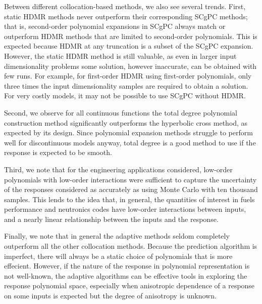 Between different collocation-based methods, we also see several trends.  First, static HDMR methods never outperform their
corresponding SCgPC methods; that is, second-order polynomial expansions in SCgPC always match or outperform HDMR methods
that are limited to second-order polynomials.  This is expected because HDMR at any truncation is a subset of the SCgPC
expansion.  However, the static HDMR method is still valuable, as even in larger input dimensionality problems
some solution, however inaccurate,
can be obtained with few runs.  For example, for first-order HDMR using first-order polynomials, only three times the input
dimensionality samples are required to obtain a solution.  For very costly models, it may not be possible to use SCgPC without
HDMR.

Second, we observe for all continuous functions the total degree polynomial construction method significantly outperforms
the hyperbolic cross method, as expected by its design.  Since polynomial expansion methods struggle to perform well for
discontinuous models anyway, total degree is a good method to use if the response is expected to be smooth.

Third, we note that for the engineering applications considered, low-order polynomials with low-order
interactions were sufficient to capture the uncertainty of the responses considered as accurately as using
Monte Carlo with ten thousand samples.  This lends to the idea that, in general, the quantities of interest in
fuels performance and neutronics codes have low-order interactions between inputs, and a nearly linear
relationship between the inputs and the response.

Finally, we note that in general the adaptive methods seldom completely outperform all the other collocation methods.  Because the
prediction algorithm is imperfect, there will always be a static choice of polynomials that is more effecient.  However, if
the nature of the response in polynomial representation is not well-known, the adaptive algorithms can be effective tools in
exploring the response polynomial space, especially when anisotropic dependence of a response on some inputs
is expected but the degree of anisotropy is unknown.

